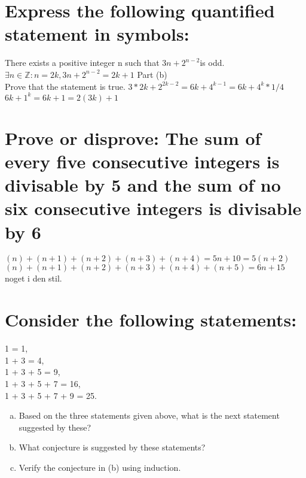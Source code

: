\section{Express the following quantified statement in symbols:}
There exists a positive integer n such that $3n+2^{n-2}$is odd.\\
$\exists n \in \mathbb{Z} : n = 2k, 3n+2^{n-2} = 2k+1$
Part (b) \\
Prove that the statement is true.
$3*2k+2^{2k-2} = 6k+4^{k-1} = 6k+4^k*1/4$\\
$6k+1^k = 6k + 1 = 2(3k) + 1$

\section{Prove or disprove: The sum of every five consecutive integers is divisable by 5 and the sum of no six consecutive integers is divisable by 6}
$(n)+(n+1)+(n+2)+(n+3)+(n+4) = 5n+10 = 5(n+2)$\\
$(n)+(n+1)+(n+2)+(n+3)+(n+4)+(n+5) = 6n+15$\\
noget i den stil.
\section{Consider the following statements:}
1 = 1,\\
1 + 3 = 4,\\
1 + 3 + 5 = 9,\\
1 + 3 + 5 + 7 = 16,\\
1 + 3 + 5 + 7 + 9 = 25.\\
\begin{enumerate}[(a)]
\item Based on the three statements given above, what is the next statement suggested by these?
\item What conjecture is suggested by these statements?
\item Verify the conjecture in (b) using induction.
\end{enumerate}

